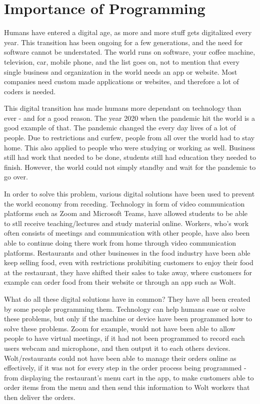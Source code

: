 \chapter{Importance of Programming} \label{chap:importance_of_programming}

Humans have entered a digital age, as more and more stuff gets 
digitalized every year. This transition has been ongoing for a few 
generations, and the need for software cannot be understated. The 
world runs on software, your coffee machine, television, car, mobile
phone, and the list goes on, not to mention that every single business 
and organization in the world needs an app or website. Most companies
need custom made applications or websites, and therefore a lot of coders
is needed.

This digital transition has made humans more dependant on technology than ever - 
and for a good reason. The year 2020 when the pandemic hit the world is a good example of that.
The pandemic changed the every day lives of a lot of people. Due to restrictions and curfew,
people from all over the world had to stay home. This also applied to people 
who were studying or working as well. Business still had work that needed to be done,
students still had education they needed to finish. However, the world could not simply 
standby and wait for the pandemic to go over. 

In order to solve this problem,
various digital solutions have been used to prevent the world economy from receding.
Technology in form of video communication platforms such as Zoom and Microsoft Teams,
have allowed students to be able to stll receive teaching/lectures and study material online. 
Workers, who's work often consists of meetings and communication with other people,
have also been able to continue doing there work from home through video communication platforms. 
Restaurants and other businesses in the food industry have been able keep selling food, 
even with restrictions prohibiting customers to enjoy their food at the restaurant, 
they have shifted their sales to take away, where customers for example can order
food from their website or through an app such as Wolt. \newline


What do all these digital solutions have in common? They have all been created by 
some people programming them. Technology can help humans ease or solve these problems, 
but only if the machine or device have been programmed how to solve these problems. 
Zoom for example, would not have been able to allow people to have virtual meetings, 
if it had not been programmed to record each users webcam and microphone, and then output
it to each others devices. Wolt/restaurants could not have been able to manage
their orders online as effectively, if it was not for every step in the order process
being programmed - from displaying the restaurant's menu cart in the app, to make customers
able to order items from the menu and then send this information to Wolt workers that then 
deliver the orders. \newline

